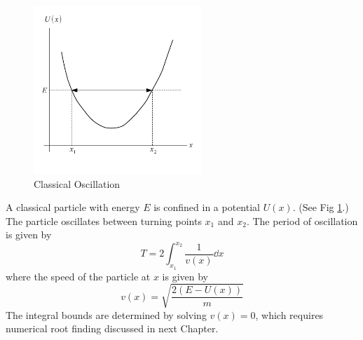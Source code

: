 \begin{figure}
\centerline{\includegraphics[width=2.5in]{03.integrals/oscillation.pdf}}
\caption{Classical Oscillation}\label{fig:oscillation}
\end{figure}

\medskip
\noindent
A classical particle with energy $E$ is confined in a potential $U(x)$. (See Fig \ref{fig:oscillation}.)  The particle oscillates between turning points $x_1$ and $x_2$.  The period of oscillation\cite{Taylor2005} is given by
%
\begin{equation}\label{eq:oscillation-period}
T=2 \int_{x_1}^{x_2} \frac{1}{v(x)} \dd{x}
\end{equation}
%
where the speed of the particle at $x$ is given by
%
\begin{equation}\label{eq:vx}
v(x) = \sqrt{\frac{2(E-U(x))}{m}}
\end{equation}
The integral bounds are determined by solving $v(x)=0$, which requires numerical root finding discussed in next Chapter.

